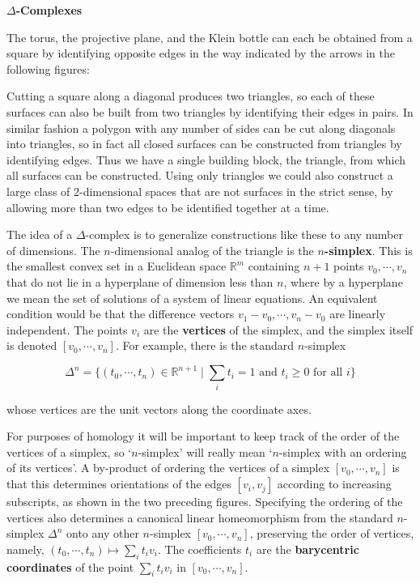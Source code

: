 \textbf{$\Delta$-Complexes}

The torus, the projective plane, and the Klein bottle can each be obtained from a square by identifying opposite edges in the way indicated by the arrows in the following figures:



Cutting a square along a diagonal produces two triangles, so each of these surfaces can also be built from two triangles by identifying their edges in pairs. In similar fashion a polygon with any number of sides can be cut along diagonals into triangles, so in fact all closed surfaces can be constructed from triangles by identifying edges. Thus we have a single building block, the triangle, from which all surfaces can be constructed. Using only triangles we could also construct a large class of 2-dimensional spaces that are not surfaces in the strict sense, by allowing more than two edges to be identified together at a time.



The idea of a $\Delta$-complex is to generalize constructions like these to any number of dimensions. The $n$-dimensional analog of the triangle is the \textbf{$n$-simplex}. This is the smallest convex set in a Euclidean space $\mathbb{R}^m$ containing $n + 1$ points $v_0, \cdots, v_n$ that do not lie in a hyperplane of dimension less than $n$, where by a hyperplane we mean the set of solutions of a system of linear equations. An equivalent condition would be that the difference vectors $v_1 - v_0, \cdots, v_n - v_0$ are linearly independent. The points $v_i$ are the \textbf{vertices} of the simplex, and the simplex itself is denoted $[v_0, \cdots, v_n]$. For example, there is the standard $n$-simplex

\[
\Delta^n = \{(t_0, \cdots, t_n) \in \mathbb{R}^{n+1} \mid \sum_i t_i = 1 \text{ and } t_i \geq 0 \text{ for all } i\}
\]

whose vertices are the unit vectors along the coordinate axes.



For purposes of homology it will be important to keep track of the order of the vertices of a simplex, so `$n$-simplex' will really mean `$n$-simplex with an ordering of its vertices'. A by-product of ordering the vertices of a simplex $[v_0, \cdots, v_n]$ is that this determines orientations of the edges $[v_i, v_j]$ according to increasing subscripts, as shown in the two preceding figures. Specifying the ordering of the vertices also determines a canonical linear homeomorphism from the standard $n$-simplex $\Delta^n$ onto any other $n$-simplex $[v_0, \cdots, v_n]$, preserving the order of vertices, namely, $(t_0, \cdots, t_n) \mapsto \sum_i t_i v_i$. The coefficients $t_i$ are the \textbf{barycentric coordinates} of the point $\sum_i t_i v_i$ in $[v_0, \cdots, v_n]$.

